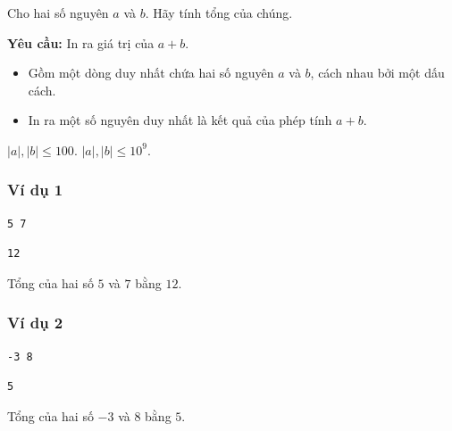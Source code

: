 
Cho hai số nguyên $a$ và $b$. Hãy tính tổng của chúng.

\medskip
\textbf{Yêu cầu:} In ra giá trị của $a + b$.

\begin{itemize}
    \item Gồm một dòng duy nhất chứa hai số nguyên $a$ và $b$, cách nhau bởi một dấu cách.
\end{itemize}

\begin{itemize}
    \item In ra một số nguyên duy nhất là kết quả của phép tính $a + b$.
\end{itemize}

\begin{makesubtasks}
     $|a|, |b| \le 100$.
     $|a|, |b| \le 10^9$.
\end{makesubtasks}


\subsubsection*{Ví dụ 1}
\begin{makesample}
\begin{lstlisting}
5 7
\end{lstlisting}
\nextsample
\begin{lstlisting}
12
\end{lstlisting}
\end{makesample}

\begin{explain}
    Tổng của hai số $5$ và $7$ bằng $12$.
\end{explain}

\subsubsection*{Ví dụ 2}
\begin{makesample}
\begin{lstlisting}
-3 8
\end{lstlisting}
\nextsample
\begin{lstlisting}
5
\end{lstlisting}
\end{makesample}

\begin{explain}
    Tổng của hai số $-3$ và $8$ bằng $5$.
\end{explain}
